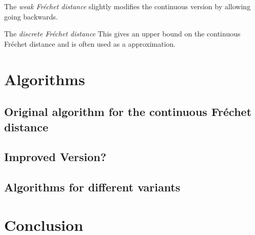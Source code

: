 \documentclass[
oneside,
fontsize=11pt
]{scrartcl}
\begin{document}
The \textit{weak Fréchet distance} slightly modifies the continuous version by allowing 
going backwards. 

The \textit{discrete Fréchet distance} 
This gives an upper bound on the continuous Fréchet distance %
and is often used as a approximation. %





\section{Algorithms}


\subsection{Original algorithm for the continuous Fréchet distance}

\subsection{Improved Version?}

\subsection{Algorithms for different variants}




\section{Conclusion}






\newpage
\appendix  %




\end{document}

